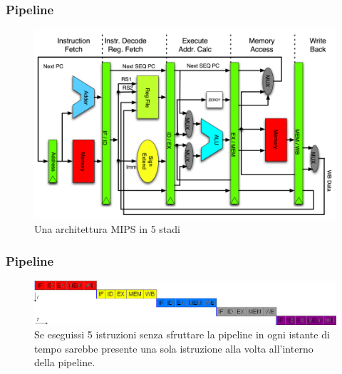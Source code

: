\begin{frame}
	\frametitle{ Pipeline}

		\begin{figure}[!htbp]
			\centering 
			\includegraphics[width=0.82\linewidth]{images/7_pipeline/pipeline_mips_structure.png}
			\caption{Una architettura MIPS in 5 stadi}
			\label{fig:pipeline_mips_structure}
		\end{figure}

\end{frame}


\begin{frame}
	\frametitle{ Pipeline}

		\begin{figure}[!htbp]
			\centering 
			\includegraphics[width=1.0\linewidth]{images/7_pipeline/pipeline_no.png}
			\caption{Se eseguissi 5 istruzioni senza sfruttare la pipeline in ogni istante di tempo sarebbe presente una sola istruzione alla volta all'interno della pipeline.}
		\end{figure}

\end{frame}


